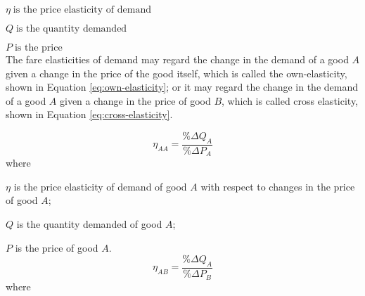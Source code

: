 $\eta \; \text{is the price elasticity of demand}$

$Q \; \text{is the quantity demanded}$

$P \; \text{is the price}$
\\[3pt]

The fare elasticities of demand may regard the change in the demand of a good $A$ given a change in the price of the good itself, which is called the own-elasticity, shown in Equation \ref{eq:own-elasticity}; or it may regard the change in the demand of a good $A$ given a change in the price of good $B$, which is called cross elasticity, shown in Equation \ref{eq:cross-elasticity}. 

\begin{equation}
\label{eq:own-elasticity}
\eta_{AA} = \frac{\% \Delta Q_A }{\% \Delta P_A}
\end{equation}
where 

$\eta$ is the price elasticity of demand of good $A$ with respect to changes in the price of good $A$;

$Q$ is the quantity demanded of good $A$;

$P$ is the price of good $A$.
\\[3pt]


\begin{equation}
\label{eq:cross-elasticity}
\eta_{AB} = \frac{\% \Delta Q_A }{\% \Delta P_B}
\end{equation}
where 

